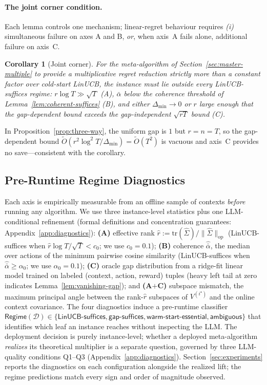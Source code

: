 \documentclass{article}
\newtheorem{corollary}{Corollary}
\theoremstyle{definition}
\theoremstyle{remark}
\theoremstyle{remark}
\begin{document}
\paragraph{The joint corner condition.}
Each lemma controls one mechanism; linear-regret behaviour requires
\emph{(i)} simultaneous failure on axes A and B, \emph{or}, when axis~A fails
alone, additional failure on axis~C.

\begin{corollary}[Joint corner]
\label{cor:joint-corner}
For the meta-algorithm of Section~\ref{sec:master-multiple} to provide a
multiplicative regret reduction strictly more than a constant factor over
cold-start LinUCB, the instance must lie outside every LinUCB-suffices
regime: $r\log T\!\gg\!\sqrt T$ \emph{(A)}, $\bar\alpha$ below the coherence
threshold of Lemma~\ref{lem:coherent-suffices} \emph{(B)}, and either
$\Delta_{\min}\!\to\!0$ or $r$ large enough that the gap-dependent bound
exceeds the gap-independent $\sqrt{rT}$ bound \emph{(C)}.
\end{corollary}

In Proposition~\ref{prop:three-way}, the uniform gap is $1$ but $r=n=T$, so
the gap-dependent bound $\widetilde O(r^2\log^2 T/\Delta_{\min})=\widetilde O(T^2)$
is vacuous and axis~C provides no save---consistent with the corollary.

\subsection{Pre-Runtime Regime Diagnostics}
\label{sec:diagnostics}

Each axis is empirically measurable from an offline sample of contexts
\emph{before} running any algorithm. We use three instance-level statistics
plus one LLM-conditional refinement (formal definitions and concentration
guarantees: Appendix~\ref{app:diagnostics}):
\textbf{(A)} effective rank
$\widehat r := \mathrm{tr}(\widehat\Sigma)/\|\widehat\Sigma\|_{\mathrm{op}}$
(LinUCB-suffices when $\widehat r\log T/\sqrt T < c_0$; we use $c_0=0.1$);
\textbf{(B)} coherence $\widehat{\bar\alpha}$, the median over actions of
the minimum pairwise cosine similarity (LinUCB-suffices when
$\widehat{\bar\alpha}\ge\alpha_0$; we use $\alpha_0=0.1$);
\textbf{(C)} oracle gap distribution from a ridge-fit linear model trained on
labeled (context, action, reward) tuples (heavy left tail at zero indicates
Lemma~\ref{lem:vanishing-gap}); and
\textbf{(A$+$C)} subspace mismatch, the maximum principal angle between the
rank-$\widehat r$ subspaces of $V^{(i^\star)}$ and the online context
covariance.
The four diagnostics induce a pre-runtime classifier
$\mathsf{Regime}(\mathcal D)\!\in\!\{\textsf{LinUCB-suffices},
\textsf{gap-suffices},\textsf{warm-start-essential},\textsf{ambiguous}\}$
that identifies which leaf an instance reaches without inspecting the LLM.
The deployment decision is purely instance-level; whether a deployed
meta-algorithm \emph{realizes} its theoretical multiplier is a separate
question, governed by three LLM-quality conditions Q1--Q3
(Appendix~\ref{app:diagnostics}). Section~\ref{sec:experiments} reports the
diagnostics on each configuration alongside the realized lift; the regime
predictions match every sign and order of magnitude observed.
\end{document}
